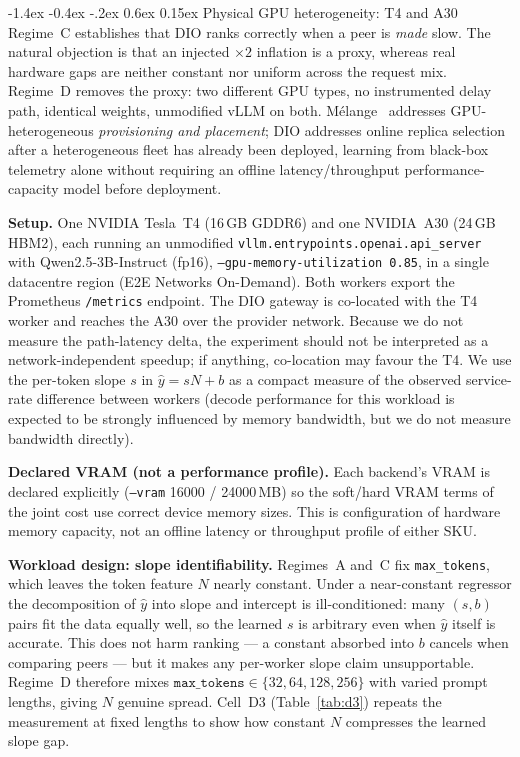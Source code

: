 \documentclass[pdflatex,sn-mathphys-num]{sn-jnl}
\makeatletter
\renewcommand{\subsection}{\@startsection{subsection}{2}{\z@}%
  {-1.4ex \@plus -0.4ex \@minus -.2ex}%
  {0.6ex \@plus 0.15ex}%
  {\normalfont\normalsize\bfseries}}%
\makeatother
\begin{document}
\subsection{Physical GPU heterogeneity: T4 and A30}
\label{sec:regimeD}
Regime~C establishes that DIO ranks correctly when a peer is \emph{made} slow.
The natural objection is that an injected $\times 2$ inflation is a proxy, whereas
real hardware gaps are neither constant nor uniform across the request mix.
Regime~D removes the proxy: two different GPU types, no instrumented delay path,
identical weights, unmodified vLLM on both. M\'{e}lange~\cite{melange} addresses
GPU-heterogeneous \emph{provisioning and placement}; DIO addresses online replica
selection after a heterogeneous fleet has already been deployed, learning from
black-box telemetry alone without requiring an offline latency/throughput
performance-capacity model before deployment.

\textbf{Setup.} One NVIDIA Tesla~T4 (16\,GB GDDR6) and one NVIDIA~A30 (24\,GB HBM2),
each running an unmodified \texttt{vllm.entrypoints.openai.api\_server} with
Qwen2.5-3B-Instruct (fp16), \texttt{--gpu-memory-utilization 0.85}, in a single
datacentre region (E2E Networks On-Demand). Both workers export the Prometheus
\texttt{/metrics} endpoint. The DIO gateway is co-located with the T4 worker and
reaches the A30 over the provider network. Because we do not measure the path-latency
delta, the experiment should not be interpreted as a network-independent speedup;
if anything, co-location may favour the T4. We use the per-token slope $s$ in
$\hat{y}=sN+b$ as a compact measure of the observed service-rate difference between
workers (decode performance for this workload is expected to be strongly influenced
by memory bandwidth, but we do not measure bandwidth directly).

\textbf{Declared VRAM (not a performance profile).} Each backend's VRAM is declared
explicitly (\texttt{--vram} 16000 / 24000\,MB) so the soft/hard VRAM terms of the
joint cost use correct device memory sizes. This is configuration of hardware
memory capacity, not an offline latency or throughput profile of either SKU.

\textbf{Workload design: slope identifiability.} Regimes~A and~C fix
\texttt{max\_tokens}, which leaves the token feature $N$ nearly constant. Under a
near-constant regressor the decomposition of $\hat{y}$ into slope and intercept is
ill-conditioned: many $(s,b)$ pairs fit the data equally well, so the learned $s$
is arbitrary even when $\hat{y}$ itself is accurate. This does not harm ranking ---
a constant absorbed into $b$ cancels when comparing peers --- but it makes any
per-worker slope claim unsupportable. Regime~D therefore mixes
$\texttt{max\_tokens}\in\{32,64,128,256\}$ with varied prompt lengths, giving $N$
genuine spread. Cell~D3 (Table~\ref{tab:d3}) repeats the measurement at fixed
lengths to show how constant $N$ compresses the learned slope gap.
\end{document}
